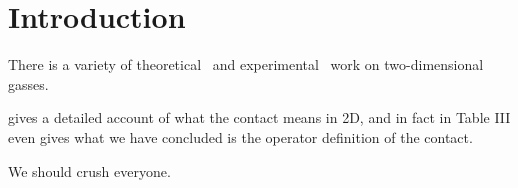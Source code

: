 \section{Introduction}\label{sec:intro}

There is a variety of theoretical~\cite{PhysRevB.12.125,PhysRevA.103.L061303,2112.09232} and experimental~\cite{PhysRevLett.106.105301,feld2011observation,PhysRevLett.120.060402,PhysRevLett.124.240403,2106.11893} work on two-dimensional gasses.

 gives a detailed account of what the contact means in 2D, and in fact in Table III even gives what we have concluded is the operator definition of the contact.

We should crush everyone.
